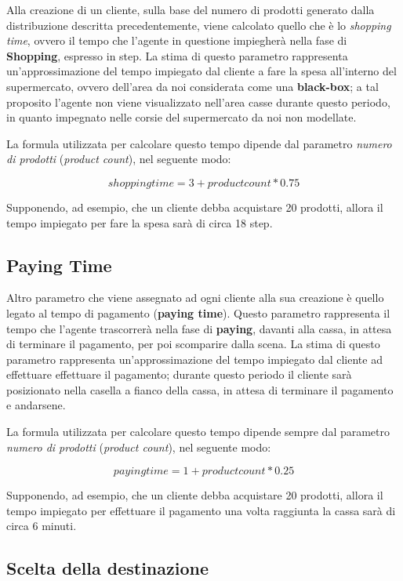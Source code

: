 Alla creazione di un cliente, sulla base del numero di prodotti generato dalla distribuzione descritta precedentemente, viene calcolato quello che è lo \textit{shopping time}, ovvero il tempo che l'agente in questione impiegherà nella fase di \textbf{Shopping}, espresso in step. La stima di questo parametro rappresenta un'approssimazione del tempo impiegato dal cliente a fare la spesa all'interno del supermercato, ovvero dell'area da noi considerata come una \textbf{black-box}; a tal proposito l'agente non viene visualizzato nell'area casse durante questo periodo, in quanto impegnato nelle corsie del supermercato da noi non modellate. 

La formula utilizzata per calcolare questo tempo dipende dal parametro \textit{numero di prodotti} (\textit{product count}), nel seguente modo: 

\begin{equation*}
shopping time = 3 + product count * 0.75
\end{equation*}

Supponendo, ad esempio, che un cliente debba acquistare 20 prodotti, allora il tempo impiegato per fare la spesa sarà di circa 18 step.

\subsection{Paying Time}

Altro parametro che viene assegnato ad ogni cliente alla sua creazione è quello legato al tempo di pagamento (\textbf{paying time}). Questo parametro rappresenta il tempo che l'agente trascorrerà nella fase di \textbf{paying}, davanti alla cassa, in attesa di terminare il pagamento, per poi scomparire dalla scena. La stima di questo parametro rappresenta un'approssimazione del tempo impiegato dal cliente ad effettuare effettuare il pagamento; durante questo periodo il cliente sarà posizionato nella casella a fianco della cassa, in attesa di terminare il pagamento e andarsene. 

La formula utilizzata per calcolare questo tempo dipende sempre dal parametro \textit{numero di prodotti} (\textit{product count}), nel seguente modo:

\begin{equation*}
paying time = 1 + product count * 0.25
\end{equation*}

Supponendo, ad esempio, che un cliente debba acquistare 20 prodotti, allora il tempo impiegato per effettuare il pagamento una volta raggiunta la cassa sarà di circa 6 minuti.

\subsection{Scelta della destinazione}



